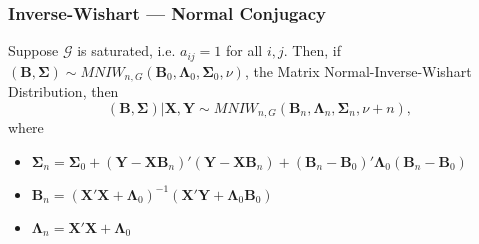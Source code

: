 
%

\begin{frame}
  \frametitle{Inverse-Wishart --- Normal Conjugacy}
  Suppose $\mathcal G$ is saturated, i.e. $a_{ij} = 1$ for all $i,j$. 
  Then, if $(\mathbf B, \mathbf \Sigma) \sim MNIW_{n,G}(\mathbf B_0, \mathbf \Lambda_0, \mathbf \Sigma_0, \nu)$, the \alert{Matrix Normal-Inverse-Wishart Distribution}, then
  \[
    (\mathbf B, \mathbf \Sigma) | \mathbf X, \mathbf Y \sim MNIW_{n,G}(\mathbf B_n, \mathbf \Lambda_n, \mathbf \Sigma_n, \nu + n),
  \]
  where 
  \begin{itemize}
    \item $\mathbf \Sigma_n = \mathbf \Sigma_0 + (\mathbf Y - \mathbf X\mathbf B_n)'(\mathbf Y-\mathbf X\mathbf B_n) + (\mathbf B_n - \mathbf B_0)'\mathbf \Lambda_0(\mathbf B_n - \mathbf B_0)$
    \item $\mathbf B_n = (\mathbf X'\mathbf X + \mathbf \Lambda_0)^{-1}(\mathbf X'\mathbf Y + \mathbf \Lambda_0\mathbf B_0)$
    \item $\mathbf \Lambda_n = \mathbf X'\mathbf X + \mathbf \Lambda_0$
  \end{itemize}
\end{frame} 

%
